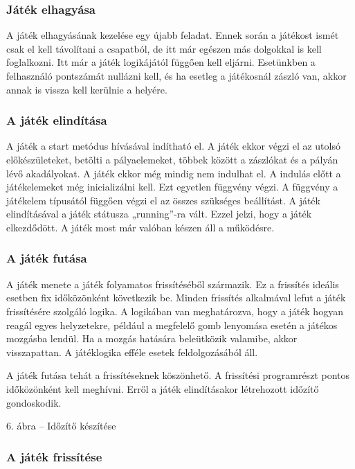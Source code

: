 \documentclass[]{article}
\begin{document}
\subsubsection{Játék elhagyása}

A játék elhagyásának kezelése egy újabb feladat. Ennek során a játékost
ismét csak el kell távolítani a csapatból, de itt már egészen más
dolgokkal is kell foglalkozni. Itt már a játék logikájától függően kell
eljárni. Esetünkben a felhasználó pontszámát nullázni kell, és ha
esetleg a játékosnál zászló van, akkor annak is vissza kell kerülnie a
helyére.


\subsubsection{A játék
elindítása}

A játék a start metódus hívásával indítható el. A játék ekkor végzi el
az utolsó előkészületeket, betölti a pályaelemeket, többek között a
zászlókat és a pályán lévő akadályokat. A játék ekkor még mindig nem
indulhat el. A indulás előtt a játékelemeket még inicializálni kell. Ezt
egyetlen függvény végzi. A függvény a játékelem típusától függően végzi
el az összes szükséges beállítást. A játék elindításával a játék
státusza „running''-ra vált. Ezzel jelzi, hogy a játék elkezdődött. A
játék most már valóban készen áll a működésre.


\subsubsection{A játék futása}

A játék menete a játék folyamatos frissítéséből származik. Ez a
frissítés ideális esetben fix időközönként következik be. Minden
frissítés alkalmával lefut a játék frissítésére szolgáló logika. A
logikában van meghatározva, hogy a játék hogyan reagál egyes
helyzetekre, például a megfelelő gomb lenyomása esetén a játékos
mozgásba lendül. Ha a mozgás hatására beleütközik valamibe, akkor
visszapattan. A játéklogika efféle esetek feldolgozásából áll.

A játék futása tehát a frissítéseknek köszönhető. A frissítési
programrészt pontos időközönként kell meghívni. Erről a játék
elindításakor létrehozott időzítő gondoskodik.

6. ábra -- Időzítő készítése


\subsubsection{A játék
frissítése}
\end{document}
